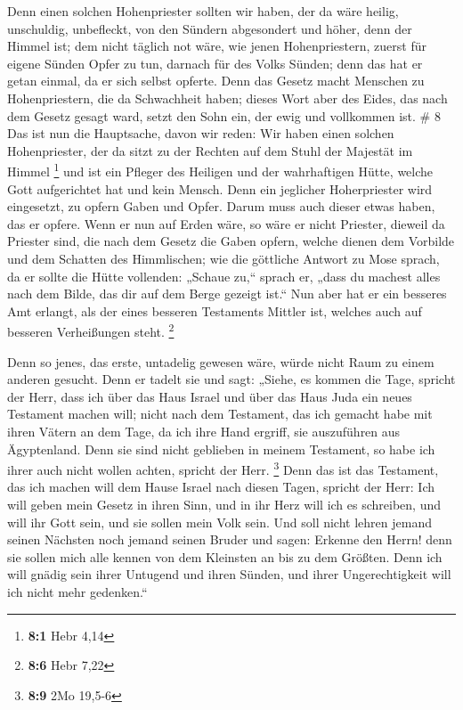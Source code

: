  Denn einen solchen Hohenpriester sollten wir haben, der
da wäre heilig, unschuldig, unbefleckt, von den Sündern abgesondert und
höher, denn der Himmel ist;  dem nicht täglich not wäre,
wie jenen Hohenpriestern, zuerst für eigene Sünden Opfer zu tun, darnach
für des Volks Sünden; denn das hat er getan einmal, da er sich selbst
opferte.  Denn das Gesetz macht Menschen zu
Hohenpriestern, die da Schwachheit haben; dieses Wort aber des Eides,
das nach dem Gesetz gesagt ward, setzt den Sohn ein, der ewig und
vollkommen ist. \# 8  Das ist nun die Hauptsache, davon
wir reden: Wir haben einen solchen Hohenpriester, der da sitzt zu der
Rechten auf dem Stuhl der Majestät im Himmel \footnote{\textbf{8:1} Hebr
  4,14}  und ist ein Pfleger des Heiligen und der
wahrhaftigen Hütte, welche Gott aufgerichtet hat und kein Mensch.
 Denn ein jeglicher Hoherpriester wird eingesetzt, zu
opfern Gaben und Opfer. Darum muss auch dieser etwas haben, das er
opfere.  Wenn er nun auf Erden wäre, so wäre er nicht
Priester, dieweil da Priester sind, die nach dem Gesetz die Gaben
opfern,  welche dienen dem Vorbilde und dem Schatten des
Himmlischen; wie die göttliche Antwort zu Mose sprach, da er sollte die
Hütte vollenden: „Schaue zu,`` sprach er, „dass du machest alles nach
dem Bilde, das dir auf dem Berge gezeigt ist.``  Nun aber
hat er ein besseres Amt erlangt, als der eines besseren Testaments
Mittler ist, welches auch auf besseren Verheißungen steht. \footnote{\textbf{8:6}
  Hebr 7,22}

 Denn so jenes, das erste, untadelig gewesen wäre, würde
nicht Raum zu einem anderen gesucht.  Denn er tadelt sie
und sagt: „Siehe, es kommen die Tage, spricht der Herr, dass ich über
das Haus Israel und über das Haus Juda ein neues Testament machen will;
 nicht nach dem Testament, das ich gemacht habe mit ihren
Vätern an dem Tage, da ich ihre Hand ergriff, sie auszuführen aus
Ägyptenland. Denn sie sind nicht geblieben in meinem Testament, so habe
ich ihrer auch nicht wollen achten, spricht der Herr. \footnote{\textbf{8:9}
  2Mo 19,5-6}  Denn das ist das Testament, das ich machen
will dem Hause Israel nach diesen Tagen, spricht der Herr: Ich will
geben mein Gesetz in ihren Sinn, und in ihr Herz will ich es schreiben,
und will ihr Gott sein, und sie sollen mein Volk sein. 
Und soll nicht lehren jemand seinen Nächsten noch jemand seinen Bruder
und sagen: Erkenne den Herrn! denn sie sollen mich alle kennen von dem
Kleinsten an bis zu dem Größten.  Denn ich will gnädig
sein ihrer Untugend und ihren Sünden, und ihrer Ungerechtigkeit will ich
nicht mehr gedenken.``

